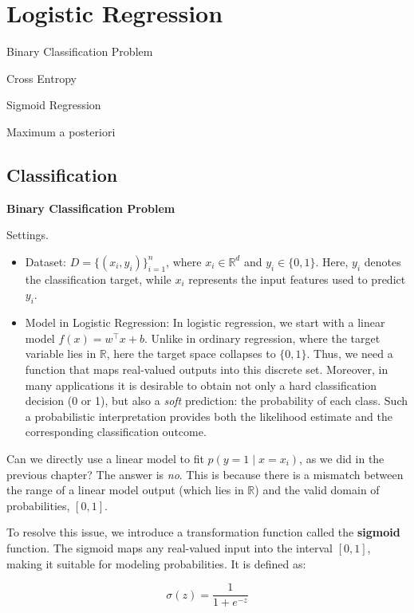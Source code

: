 \documentclass[../main]{subfiles}
\begin{document}
\chapter{Logistic Regression}
\begin{introduction}
\item Binary Classification Problem
\item Cross Entropy
\item Sigmoid Regression
\item Maximum a posteriori
\end{introduction}
\section{Classification}
\begin{example}
  \textbf{Binary Classification Problem}
\end{example}
Settings.
\begin{itemize}
  \item Dataset: $D=\{(x_i,y_i)\}_{i=1}^n$, where $x_i\in\mathbb{R}^d$ and $y_i\in\{0,1\}$.  
  Here, $y_i$ denotes the classification target, while $x_i$ represents the input features used to predict $y_i$.
  \item Model in Logistic Regression: In logistic regression, we start with a linear model $f(x) = w^\top x + b$.
  Unlike in ordinary regression, where the target variable lies in $\mathbb{R}$, here the target space collapses to $\{0,1\}$. Thus, we need a function that maps real-valued outputs into this discrete set. Moreover, in many applications it is desirable to obtain not only a hard classification decision (0 or 1), but also a \emph{soft} prediction: the probability of each class. Such a probabilistic interpretation provides both the likelihood estimate and the corresponding classification outcome.
\end{itemize}
Can we directly use a linear model to fit $p(y=1 \mid x=x_i)$, as we did in the previous chapter? The answer is \emph{no}. This is because there is a mismatch between the range of a linear model output (which lies in $\mathbb{R}$) and the valid domain of probabilities, $[0,1]$. 

To resolve this issue, we introduce a transformation function called the \textbf{sigmoid} function. The sigmoid maps any real-valued input into the interval $[0,1]$, making it suitable for modeling probabilities. It is defined as:
\begin{definition}
  \begin{equation}
    \sigma(z) = \frac{1}{1 + e^{-z}}
\end{equation}
\end{definition}
\end{document}
